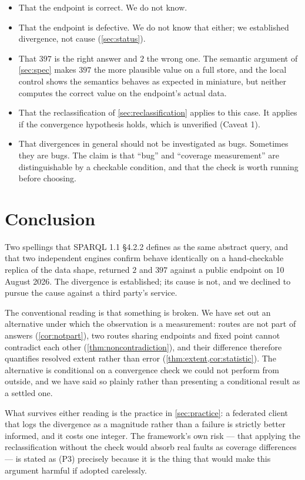 \documentclass[11pt,a4paper]{article}
\theoremstyle{plain}
\theoremstyle{definition}
\theoremstyle{remark}
\begin{document}
\begin{itemize}[leftmargin=1.6em]
\item That the endpoint is correct. We do not know.
\item That the endpoint is defective. We do not know that either; we established
divergence, not cause (\cref{sec:status}).
\item That $397$ is the right answer and $2$ the wrong one. The semantic
argument of \cref{sec:spec} makes $397$ the more plausible value on a full
store, and the local control shows the semantics behaves as expected in
miniature, but neither computes the correct value on the endpoint's actual data.
\item That the reclassification of \cref{sec:reclassification} applies to this
case. It applies if the convergence hypothesis holds, which is unverified
(Caveat 1).
\item That divergences in general should not be investigated as bugs. Sometimes
they are bugs. The claim is that ``bug'' and ``coverage measurement'' are
distinguishable by a checkable condition, and that the check is worth running
before choosing.
\end{itemize}

\section{Conclusion}

Two spellings that SPARQL 1.1 §4.2.2 defines as the same abstract query, and
that two independent engines confirm behave identically on a hand-checkable
replica of the data shape, returned $2$ and $397$ against a public endpoint on
10 August 2026. The divergence is established; its cause is not, and we declined
to pursue the cause against a third party's service.

The conventional reading is that something is broken. We have set out an
alternative under which the observation is a measurement: routes are not part of
answers (\cref{cor:notpart}), two routes sharing endpoints and fixed point
cannot contradict each other (\cref{thm:noncontradiction}), and their difference
therefore quantifies resolved extent rather than error
(\cref{thm:extent,cor:statistic}). The alternative is conditional on a
convergence check we could not perform from outside, and we have said so
plainly rather than presenting a conditional result as a settled one.

What survives either reading is the practice in \cref{sec:practice}: a federated
client that logs the divergence as a magnitude rather than a failure is strictly
better informed, and it costs one integer. The framework's own risk --- that
applying the reclassification without the check would absorb real faults as
coverage differences --- is stated as (P3) precisely because it is the thing that
would make this argument harmful if adopted carelessly.



\end{document}
